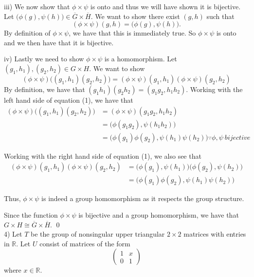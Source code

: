 \documentclass{article}
\begin{document}
iii) We now show that $\phi \times \psi$ is onto and thus we will have shown it is bijective. Let $\big(\phi(g), \psi(h)\big) \in \overline{G} \times \overline{H}$. We want to show there exist $(g, h)$ such that
$$(\phi \times \psi)(g, h) = \big(\phi(g), \psi(h)\big).$$
By definition of $\phi \times \psi$, we have that this is immediately true. So $\phi \times \psi$ is onto and we then have that it is bijective.

iv) Lastly we need to show $\phi \times \psi$ is a homomorphism. Let $(g_1, h_1), (g_2, h_2) \in G \times H$. We want to show
\begin{equation}
(\phi \times \psi)\big((g_1, h_1)(g_2, h_2)\big) = (\phi \times \psi)(g_1, h_1) (\phi \times \psi)(g_2, h_2)
\end{equation}
By definition, we have that $(g_1h_1)(g_2h_2) = (g_1g_2, h_1h_2)$. Working with the left hand side of equation (1), we have that
\begin{align*}
	(\phi \times \psi)\big((g_1, h_1)(g_2, h_2)\big) &= (\phi \times \psi)(g_1g_2, h_1h_2) \\
	&= \big(\phi(g_1g_2), \psi(h_1h_2)\big) \\
	&= \big(\phi(g_1)\phi(g_2), \psi(h_1)\psi(h_2)\big) \because \phi, \psi \ bijective
\end{align*}

Working with the right hand side of equation (1), we also see that
\begin{align*}
	(\phi \times \psi)(g_1, h_1) (\phi \times \psi)(g_2, h_2) &= \big(\phi(g_1), \psi(h_1)\big)\big(\phi(g_2), \psi(h_2)\big) \\
	&= \big(\phi(g_1)\phi(g_2), \psi(h_1)\psi(h_2)\big)
\end{align*}

Thus, $\phi \times \psi$ is indeed a group homomorphism as it respects the group structure.

Since the function $\phi \times \psi$ is bijective and a group homomorphism, we have that \linebreak $G \times H \cong \overline{G} \times \overline{H}$. \qed \\

4) Let $T$ be the group of nonsingular upper triangular $2 \times 2$ matrices with entries in $\mathbb{R}$. Let $U$ consist of matrices of the form 
$$\begin{pmatrix}
	1 & x \\
	0 & 1
\end{pmatrix}$$
where $x \in \mathbb{R}$.
\end{document}
